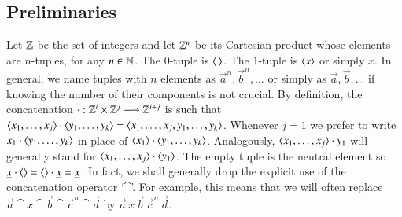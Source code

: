 \subsection{Preliminaries}\label{subSect:Preliminaries}
Let $ \mathbb{Z} $ be the set of integers and let $ \mathbb{Z}^{n}  $ be its Cartesian product whose elements 
are $ n $-tuples, for any $ n \in \mathbb{N} $. The $ 0 $-tuple is $ \langle\,\rangle $. The $ 1 $-tuple
is $ \langle x\rangle $ or simply $ x $. In general, we name tuples with $ n $ 
elements as $ \vec{a}^n, \vec{b}^n, \ldots $ 
or simply as $ \vec{a}, \vec{b}, \ldots $ if knowing the number of their components is not 
crucial.
By definition, the concatenation $ \cdot: \mathbb{Z}^i \times \mathbb{Z}^j \longrightarrow \mathbb{Z}^{i+j} $ 
is such that $ \langle x_1,\ldots,x_j\rangle \cdot \langle y_1,\ldots,y_k\rangle = \langle x_1,\ldots,x_j,y_1,\ldots,y_k\rangle$.
Whenever $ j = 1  $ we prefer to write $ x_1 \cdot \langle y_1,\ldots,y_k\rangle $ in place of 
$ \langle x_1\rangle \cdot \langle y_1,\ldots,y_k\rangle $. Analogously, $ \langle x_1,\ldots,x_j\rangle \cdot y_1$ will 
generally stand for $ \langle x_1,\ldots,x_j\rangle \cdot \langle y_1\rangle$. The empty tuple is the neutral element so
$ \underline{x} \cdot \langle\rangle = \langle\rangle \cdot \underline{x} = \underline{x} $.
In fact, we shall generally drop the explicit use of the concatenation operator `$ \cat $'. 
For example, this means that we will often replace 
$ \vec{a} \cat x \cat \vec{b} \cat \vec{c}^n \cat \vec{d} $ by
$ \vec{a}\, x\, \vec{b}\, \vec{c}^n\, \vec{d} $. 
 
